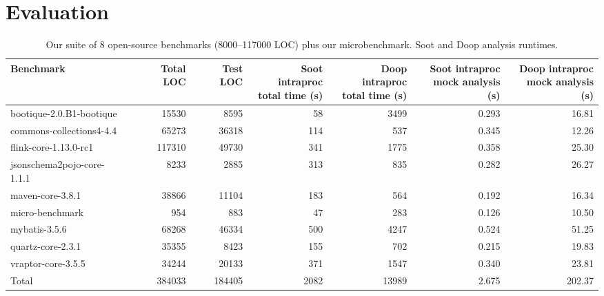 \section{Evaluation}
\label{sec:evaluation}

\begin{table*}
	\centering
	\caption{Our suite of 8 open-source benchmarks (8000--117000 LOC) plus our microbenchmark. Soot and Doop analysis runtimes.}
	\begin{tabular}{lrrrrrr}
		\toprule
		Benchmark & Total LOC & Test LOC & \thead{Soot intraproc \\ total time (s)} & \thead{Doop intraproc \\ total time (s)} & \thead{Soot intraproc \\ mock analysis (s)}  & \thead{Doop intraproc \\ mock analysis (s)} \\
		\midrule
		bootique-2.0.B1-bootique           		&  15530   & 8595   & 58  & 3499  &  0.293   & 16.81       \\
		commons-collections4-4.4           		&  65273   & 36318  & 114 & 537   &  0.345   & 12.26       \\
		flink-core-1.13.0-rc1           		&  117310  & 49730  & 341 & 1775  &  0.358   & 25.30        \\
		jsonschema2pojo-core-1.1.1         		&  8233    & 2885   & 313 & 835   &  0.282   & 26.27       \\
		maven-core-3.8.1   		           		&  38866   & 11104  & 183 & 564   &  0.192   & 16.34        \\
		micro-benchmark         		  		&  954     & 883	& 47  & 283   &  0.126   & 10.50        \\
		mybatis-3.5.6         		  			&  68268   & 46334  & 500 & 4247  &  0.524   & 51.25        \\
		quartz-core-2.3.1        	  			&  35355   & 8423   & 155 & 702   &  0.215   & 19.83     \\
		vraptor-core-3.5.5         	  			&  34244   & 20133  & 371 & 1547  &  0.340   & 23.81      \\
		\bottomrule
		Total         	  						&  384033  & 184405 & 2082 & 13989 &  2.675  & 202.37     \\
	\end{tabular}
	\label{tab:runtimes}
\end{table*}

